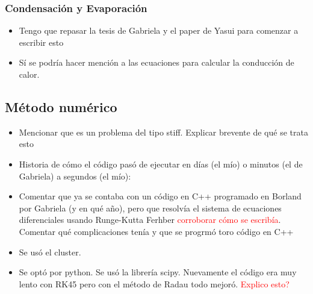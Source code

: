\documentclass[aps,prb,twocolumn,superscriptaddress,floatfix,longbibliography,10pt]{revtex4-2}
\newcounter{para}
\begin{document}
\begin{itemize}
\subsubsection{Condensación y Evaporación}

\begin{itemize}
  \item Tengo que repasar la tesis de Gabriela y el paper de Yasui para comenzar a escribir esto
  \item Sí se podría hacer mención a las ecuaciones para calcular la conducción de calor.
\end{itemize}

\subsection{Método numérico}

\begin{itemize}
  \item Mencionar que es un problema del tipo stiff. Explicar brevente de qué se trata esto
  \item Historia de cómo el código pasó de ejecutar en días (el mío) o minutos (el de Gabriela) a segundos (el mío):
  \item Comentar que ya se contaba con un código en C++ programado en Borland por Gabriela (y en qué año), pero que resolvía el sistema de ecuaciones diferenciales usando Runge-Kutta Ferhber \textcolor{red}{corroborar cómo se escribía}. Comentar qué complicaciones tenía y que se progrmó toro código en C++
  \item Se usó el cluster.
  \item Se optó por python. Se usó la librería scipy. Nuevamente el código era muy lento con RK45 pero con el método de Radau todo mejoró. \textcolor{red}{Explico esto?}
\end{itemize}
















































\end{itemize}
\end{document}
